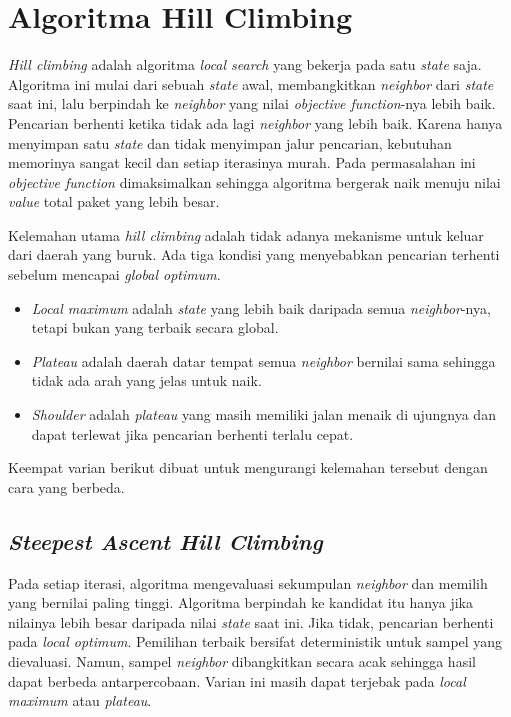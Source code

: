 \section{Algoritma Hill Climbing}

\textit{Hill climbing} adalah algoritma \textit{local search} yang bekerja pada satu \textit{state} saja. Algoritma ini mulai dari sebuah \textit{state} awal, membangkitkan \textit{neighbor} dari \textit{state} saat ini, lalu berpindah ke \textit{neighbor} yang nilai \textit{objective function}-nya lebih baik. Pencarian berhenti ketika tidak ada lagi \textit{neighbor} yang lebih baik. Karena hanya menyimpan satu \textit{state} dan tidak menyimpan jalur pencarian, kebutuhan memorinya sangat kecil dan setiap iterasinya murah. Pada permasalahan ini \textit{objective function} dimaksimalkan sehingga algoritma bergerak naik menuju nilai \textit{value} total paket yang lebih besar.

Kelemahan utama \textit{hill climbing} adalah tidak adanya mekanisme untuk keluar dari daerah yang buruk. Ada tiga kondisi yang menyebabkan pencarian terhenti sebelum mencapai \textit{global optimum}.
\begin{itemize}
    \item \textit{Local maximum} adalah \textit{state} yang lebih baik daripada semua \textit{neighbor}-nya, tetapi bukan yang terbaik secara global.
    \item \textit{Plateau} adalah daerah datar tempat semua \textit{neighbor} bernilai sama sehingga tidak ada arah yang jelas untuk naik.
    \item \textit{Shoulder} adalah \textit{plateau} yang masih memiliki jalan menaik di ujungnya dan dapat terlewat jika pencarian berhenti terlalu cepat.
\end{itemize}
Keempat varian berikut dibuat untuk mengurangi kelemahan tersebut dengan cara yang berbeda.

\subsection{\textit{Steepest Ascent Hill Climbing}}
Pada setiap iterasi, algoritma mengevaluasi sekumpulan \textit{neighbor} dan memilih yang bernilai paling tinggi. Algoritma berpindah ke kandidat itu hanya jika nilainya lebih besar daripada nilai \textit{state} saat ini. Jika tidak, pencarian berhenti pada \textit{local optimum}. Pemilihan terbaik bersifat deterministik untuk sampel yang dievaluasi. Namun, sampel \textit{neighbor} dibangkitkan secara acak sehingga hasil dapat berbeda antarpercobaan. Varian ini masih dapat terjebak pada \textit{local maximum} atau \textit{plateau}.

